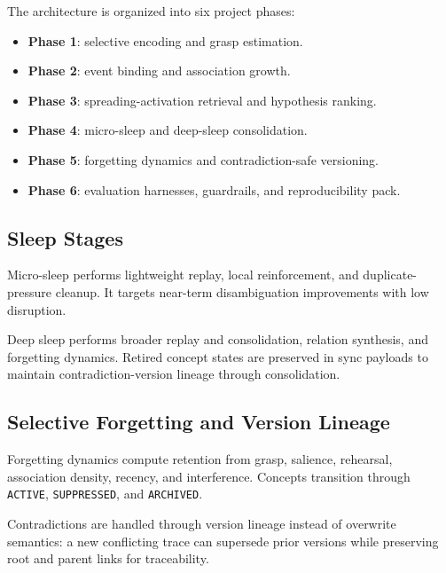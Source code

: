 \documentclass[11pt,a4paper]{article}
\begin{document}
The architecture is organized into six project phases:
\begin{itemize}[leftmargin=1.5em]
    \item \textbf{Phase 1}: selective encoding and grasp estimation.
    \item \textbf{Phase 2}: event binding and association growth.
    \item \textbf{Phase 3}: spreading-activation retrieval and hypothesis ranking.
    \item \textbf{Phase 4}: micro-sleep and deep-sleep consolidation.
    \item \textbf{Phase 5}: forgetting dynamics and contradiction-safe versioning.
    \item \textbf{Phase 6}: evaluation harnesses, guardrails, and reproducibility pack.
\end{itemize}

\subsection{Sleep Stages}
Micro-sleep performs lightweight replay, local reinforcement, and duplicate-pressure cleanup. It targets near-term disambiguation improvements with low disruption.

Deep sleep performs broader replay and consolidation, relation synthesis, and forgetting dynamics. Retired concept states are preserved in sync payloads to maintain contradiction-version lineage through consolidation.

\subsection{Selective Forgetting and Version Lineage}
Forgetting dynamics compute retention from grasp, salience, rehearsal, association density, recency, and interference. Concepts transition through \texttt{ACTIVE}, \texttt{SUPPRESSED}, and \texttt{ARCHIVED}.

Contradictions are handled through version lineage instead of overwrite semantics: a new conflicting trace can supersede prior versions while preserving root and parent links for traceability.
\end{document}
